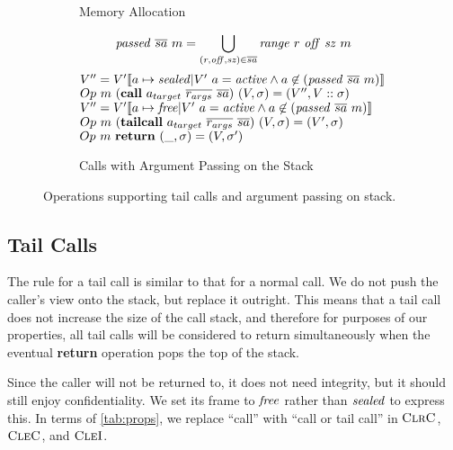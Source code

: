\documentclass[10pt,conference]{ieeetran}%
\theoremstyle{definition}
\begin{document}
\begin{figure*}
\begin{subfigure}{0.4\textwidth}
    \caption{Memory Allocation}
    \label{sfig:publicalloc}
  \end{subfigure}
  \begin{subfigure}{0.6\textwidth}
    \[\mathit{passed} ~ \overline{sa} ~ m = \bigcup_{(r,\mathit{off},\mathit{sz}) \in \overline{sa}}
    \mathit{range} ~ r ~ \mathit{off} ~ \mathit{sz} ~ m\]
               {\(V'' = V'\llbracket a \mapsto \mathit{sealed} | V' ~ a = \mathit{active} \land a \not \in (\mathit{passed} ~ \overline{sa} ~ m) \rrbracket\)}
               {\(Op ~ m ~ (\mathbf{call} ~ a_{target} ~ \overline{r_{args}} ~ \overline{sa})
                 ~ (V,\sigma) = (V'',V::\sigma)\)}
               {\(V'' = V'\llbracket a \mapsto \mathit{free} | V' ~ a = \mathit{active} \land a \not \in (\mathit{passed} ~ \overline{sa} ~ m) \rrbracket\)}
               {\(Op ~ m ~ (\mathbf{tail call} ~ a_{target} ~ \overline{r_{args}} ~ \overline{sa})
                 ~ (V,\sigma) = (V',\sigma)\)}
             {\(Op ~ m ~ \mathbf{return} ~ (\_, \sigma) = (V, \sigma')\)}

    \caption{Calls with Argument Passing on the Stack}
    \label{sfig:stkargs}
  \end{subfigure}
  \caption{Operations supporting tail calls and argument passing on stack.}
  \label{fig:advops}
\end{figure*}

\subsection{Tail Calls}

The rule for a tail call is similar to that for a normal call.
We do not push the caller's view onto the stack,
but replace it outright. This means that a tail call does not increase the size of
the call stack, and therefore for purposes of our properties, all tail
calls will
be considered to return simultaneously when the eventual {\bf return} operation
pops the top of the stack.

Since the caller will not be returned to, it does not need integrity, but
it should still enjoy confidentiality. We set its frame to \(\mathit{free}\) rather
than \(\mathit{sealed}\) to express this. In terms of \cref{tab:props}, we replace
``call'' with ``call or tail call'' in \(\textnormal{\sc ClrC}\), \(\textnormal{\sc CleC}\), and \(\textnormal{\sc CleI}\).
\end{document}
